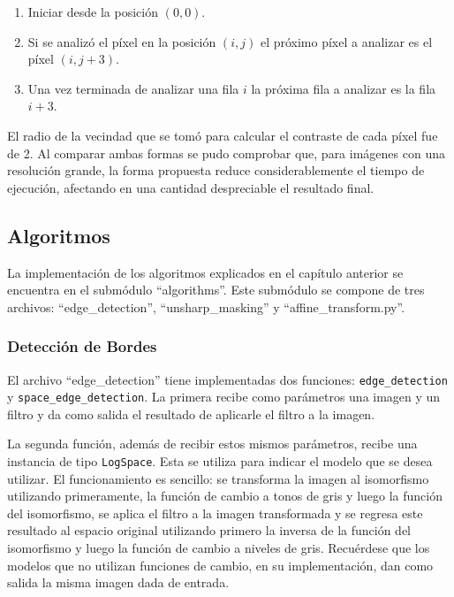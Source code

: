 \begin{enumerate}
	\item Iniciar desde la posici\'on $(0,0)$.
	\item Si se analiz\'o el p\'ixel en la posici\'on $(i,j)$ el pr\'oximo p\'ixel a analizar es el p\'ixel $(i,j+3)$.
	\item Una vez terminada de analizar una fila $i$ la pr\'oxima fila a analizar es la fila $i+3$.
\end{enumerate}

El radio de la vecindad que se tom\'o para calcular el contraste de cada p\'ixel fue de 2. Al comparar ambas formas se pudo comprobar que, para im\'agenes con una resoluci\'on grande, la forma propuesta reduce considerablemente el tiempo de ejecuci\'on, afectando en una cantidad despreciable el resultado final.

\subsection{Algoritmos}

La implementaci\'on de los algoritmos explicados en el cap\'itulo anterior se encuentra en el subm\'odulo ``algorithms''. Este subm\'odulo se compone de tres archivos: ``edge\_detection'', ``unsharp\_masking'' y ``affine\_transform.py''.

\subsubsection{Detecci\'on de Bordes}

El archivo ``edge\_detection'' tiene implementadas dos funciones: \verb|edge_detection| y \verb|space_edge_detection|. La primera recibe como par\'ametros una imagen y un filtro y da como salida el resultado de aplicarle el filtro a la imagen. 

La segunda funci\'on, adem\'as de recibir estos mismos par\'ametros, recibe una instancia de tipo \verb|LogSpace|. Esta se utiliza para indicar el modelo que se desea utilizar. El funcionamiento es sencillo: se transforma la imagen al isomorfismo utilizando primeramente, la funci\'on de cambio a tonos de gris y luego la funci\'on del isomorfismo, se aplica el filtro a la imagen transformada y se regresa este resultado al espacio original utilizando primero la inversa de la funci\'on del isomorfismo y luego la funci\'on de cambio a niveles de gris. Recu\'erdese que los modelos que no utilizan funciones de cambio, en su implementaci\'on, dan como salida la misma imagen dada de entrada.


